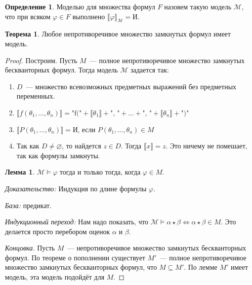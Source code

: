\documentclass[a4paper,11pt]{article}
\theoremstyle{definition}
\newtheorem*{thm}{Теорема}
\newtheorem*{lmm}{Лемма}
\newtheorem*{dfn}{Определение}
\newcommand{\True}{\text{И}}
\begin{document}
\begin{dfn}
Моделью для множества формул $F$ назовем такую модель $\mathcal{M}$, что при
всяком $\varphi \in F$ выполнено $\llbracket\varphi\rrbracket_{\mathcal{M}} =
\True$.
\end{dfn}
\begin{thm}
Любое непротиворечивое множество замкнутых формул имеет модель.
\end{thm}
\begin{proof}
Построим. Пусть $M$~--- полное непротиворечивое множество замкнутых
бескванторных формул. Тогда модель $\mathcal{M}$ задается так:
\begin{enumerate}
\item $D$~--- множество всевозможных предметных выражений без предметных
  переменных.
\item $\llbracket f(\theta_1, \dots, \theta_n)\rrbracket = \text{"f("} +
  \llbracket\theta_1\rrbracket + \text{", "} + \dots + \text{", "} +
  \llbracket\theta_n\rrbracket + \text{")"}$
\item $\llbracket P(\theta_1, \dots, \theta_n)\rrbracket = \True$, если
  $P(\theta_1, \dots, \theta_n) \in M$
\item Так как $D \ne \varnothing$, то найдется $z \in D$. Тогда
  $\llbracket x\rrbracket = z$. Это ничему не помешает, так как формулы замкнуты.
\end{enumerate}
\begin{lmm}
$\mathcal{M} \models \varphi$ тогда и только тогда, когда $\varphi \in M$.
\end{lmm}
\emph{Доказательство:} Индукция по длине формулы $\varphi$.

\emph{База:} предикат.

\emph{Индукционный переход:} Нам надо показать, что $\mathcal{M} \models \alpha
\star \beta \Leftrightarrow \alpha \star \beta \in M$. Это делается просто
перебором оценок $\alpha$ и $\beta$.

\emph{Концовка.} Пусть $M$~--- непротиворечивое множество замкнутых
бескванторных формул. По теореме о пополнении существует $M'$~--- полное
непротиворечивое множество замкнутых бескванторных формул, что $M \subseteq
M'$. По лемме $M'$ имеет модель, эта модель подойдёт для $M$.
\end{proof}
\end{document}
